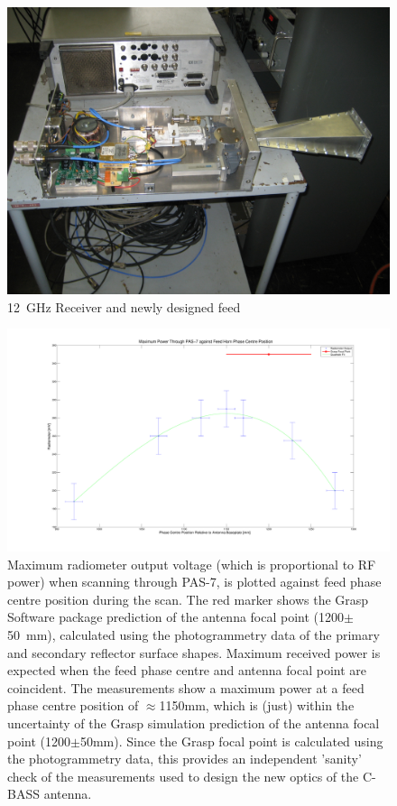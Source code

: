 \begin{figure}[ht]
 \centering
 \includegraphics[width=\textwidth]{images/PAS7_cross_scans/img_1093.jpg}
 \caption{12~GHz Receiver and newly designed feed}
 \label{fig:feed}
\end{figure}

\begin{figure}[ht]
 \centering
 \includegraphics[width=\textwidth]{images/PAS7_cross_scans/focal_point.pdf}
 \caption{Maximum radiometer output voltage (which is proportional to RF power) when scanning through PAS-7, is plotted against feed phase centre position during the scan. The red marker shows the Grasp Software package prediction of the antenna focal point (1200$\pm$50~mm), calculated using the photogrammetry data of the primary and secondary reflector surface shapes. Maximum received power is expected when the feed phase centre and antenna focal point are coincident. The measurements show a maximum power at a feed phase centre position of $\approx$1150mm, which is (just) within the uncertainty of the Grasp simulation prediction of the antenna focal point (1200$\pm$50mm). Since the Grasp focal point is calculated using the photogrammetry data, this provides an independent 'sanity' check of the measurements used to design the new optics of the C-BASS antenna.}
 \label{fig:focal_point}
\end{figure}

